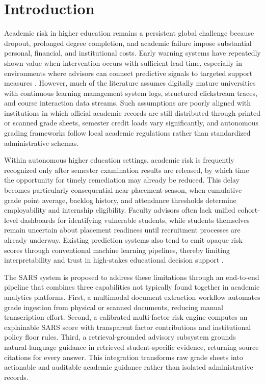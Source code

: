 \documentclass{article}
\begin{document}
\section{Introduction}
Academic risk in higher education remains a persistent global challenge because dropout, prolonged degree completion, and academic failure impose substantial personal, financial, and institutional costs. Early warning systems have repeatedly shown value when intervention occurs with sufficient lead time, especially in environments where advisors can connect predictive signals to targeted support measures \cite{baker2014edm,essa2012predictive,arnold2012course}. However, much of the literature assumes digitally mature universities with continuous learning management system logs, structured clickstream traces, and course interaction data streams. Such assumptions are poorly aligned with institutions in which official academic records are still distributed through printed or scanned grade sheets, semester credit loads vary significantly, and autonomous grading frameworks follow local academic regulations rather than standardized administrative schemas.

Within autonomous higher education settings, academic risk is frequently recognized only after semester examination results are released, by which time the opportunity for timely remediation may already be reduced. This delay becomes particularly consequential near placement season, when cumulative grade point average, backlog history, and attendance thresholds determine employability and internship eligibility. Faculty advisors often lack unified cohort-level dashboards for identifying vulnerable students, while students themselves remain uncertain about placement readiness until recruitment processes are already underway. Existing prediction systems also tend to emit opaque risk scores through conventional machine learning pipelines, thereby limiting interpretability and trust in high-stakes educational decision support \cite{jayaprakash2014early,romero2020survey,khosravi2022xai}.

The SARS system is proposed to address these limitations through an end-to-end pipeline that combines three capabilities not typically found together in academic analytics platforms. First, a multimodal document extraction workflow automates grade ingestion from physical or scanned documents, reducing manual transcription effort. Second, a calibrated multi-factor risk engine computes an explainable SARS score with transparent factor contributions and institutional policy floor rules. Third, a retrieval-grounded advisory subsystem grounds natural-language guidance in retrieved student-specific evidence, returning source citations for every answer. This integration transforms raw grade sheets into actionable and auditable academic guidance rather than isolated administrative records.
\end{document}
